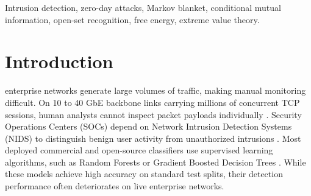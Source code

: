 \documentclass[10pt,journal,compsoc]{IEEEtran}
\begin{document}
{\begin{abstract}
We evaluated our implementation across five random seeds on the CIC-IDS2017 benchmark. The proposed system achieves 83.14\% Macro-F1 and reduces the benign false alarm rate to 0.94\% (a twenty-fold reduction compared to dual-blanket baselines). On unseen zero-day traffic, the system achieves an overall recall of 46.68\% (560/1,200 flows): it detects 100.00\% of unseen Botnet attacks (560/560 flows) due to structural beaconing differences, but fails on stealthy Infiltration attacks (0.03\% recall, 0/640 flows) because flow-level statistics without payload inspection cannot differentiate administrative SSH/RDP sessions from legitimate traffic. On our evaluation hardware, the implemented Python/PyTorch pipeline processes flows in an average of 8.65 microseconds (115,620 flows/second). Finally, we discuss an architectural design based on kernel bypass that could scale processing to line rate in production environments.
\end{abstract}

\begin{IEEEkeywords}
Intrusion detection, zero-day attacks, Markov blanket, conditional mutual information, open-set recognition, free energy, extreme value theory.
\end{IEEEkeywords}}

\maketitle
\IEEEdisplaynontitleabstractindextext
\IEEEpeerreviewmaketitle

\section{Introduction}
 enterprise networks generate large volumes of traffic, making manual monitoring difficult. On 10 to 40 GbE backbone links carrying millions of concurrent TCP sessions, human analysts cannot inspect packet payloads individually \cite{viegas2021machine, ning2021}. Security Operations Centers (SOCs) depend on Network Intrusion Detection Systems (NIDS) to distinguish benign user activity from unauthorized intrusions \cite{pajouh2019}. Most deployed commercial and open-source classifiers use supervised learning algorithms, such as Random Forests or Gradient Boosted Decision Trees \cite{mohiuddin2023}. While these models achieve high accuracy on standard test splits, their detection performance often deteriorates on live enterprise networks.
\end{document}
